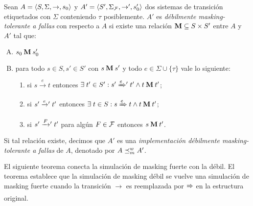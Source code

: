\begin{definition} \label{def:weak_mask}
  Sean $A =\langle S, \Sigma, \rightarrow, s_0 \rangle$ y $A' =\langle S',
  \Sigma_{\mathcal{F}}, \rightarrow', s'_0 \rangle$ dos sistemas de transición etiquetados con $\Sigma$
  conteniendo $\tau$ posiblemente.  $A'$ es \emph{débilmente masking-tolerante a fallas}
  con respecto a $A$ si existe una relación $\mathbin{\mathbf{M}} \subseteq S
  \times S'$ entre $A$ y $A'$ tal que:

\begin{enumerate}[(A)]
  \item $s_0 \mathbin{\mathbf{M}} s'_0$
  \item para todo $s \in S, s' \in S'$ con $s \mathbin{\mathbf{M}} s'$ y todo $e \in \Sigma \cup \{\tau\}$ vale lo siguiente:

  \begin{enumerate}[(1)]
    \item si $s \xrightarrow{e} t$ entonces 
    $\exists\; t' \in S': s' \mathrel{{\xRightarrow[]{e}}{}'} t' 
    \wedge t \mathbin{\mathbf{M}} t'$;

      \item si $s' \mathrel{{\xrightarrow[]{e}}{}'} t'$ entonces  
      $\exists \; t \in S: s \xRightarrow{e} t  
      \wedge t \mathbin{\mathbf{M}} t'$;

      \item si $s' \mathrel{{\xrightarrow[]{F}}{}'} t'$ para algún $F \in \mathcal{F}$ entonces 
      $s \mathbin{\mathbf{M}} t'$.
  \end{enumerate}
\end{enumerate}

%
Si tal relación existe, decimos que $A'$ es una \emph{implementación débilmente masking-tolerante a fallas} de
$A$, denotado por $A \preceq^w_{m} A'$.
\end{definition}

El siguiente teorema conecta la simulación de masking fuerte con la débil. El teorema establece que la simulación de masking débil se vuelve una simulación de masking fuerte cuando la transición $\xrightarrow{}$ es reemplazada por $\xRightarrow{}$ en la estructura original.


